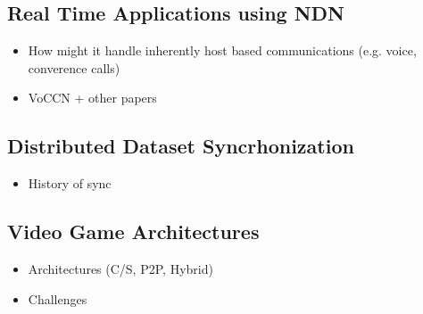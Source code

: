 \subsection{Real Time Applications using NDN}
\begin{itemize}
    \item How might it handle inherently host based communications (e.g. voice, converence calls)
    \item VoCCN + other papers
\end{itemize}

\subsection{Distributed Dataset Syncrhonization}
\begin{itemize}
    \item History of sync
\end{itemize}

\subsection{Video Game Architectures}
\begin{itemize}
    \item Architectures (C/S, P2P, Hybrid)
    \item Challenges
\end{itemize}

